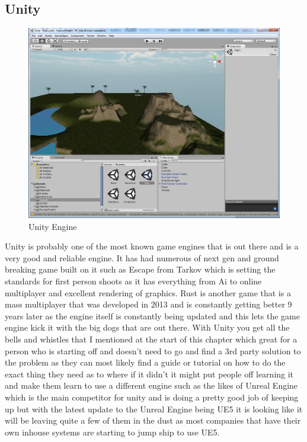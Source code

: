 \subsection{Unity}
\begin{figure}[H]
    \centering
    \includegraphics[scale=.3]{img/Unity.png}
    \caption{Unity Engine}
    \label{Unity}
\end{figure}
Unity is probably one of the most known game engines that is out there and is a very good and reliable engine. It has had numerous of next gen and ground breaking game built on it such as Escape from Tarkov which is setting the standards for first person shoots as it has everything from Ai to online multiplayer and excellent rendering of graphics. Rust is another game that is a mass multiplayer that was developed in 2013 and is constantly getting better 9 years later as the engine itself is constantly being updated and this lets the game engine kick it with the big dogs that are out there. With Unity you get all the bells and whistles that I mentioned at the start of this chapter which great for a person who is starting off and doesn't need to go and find a 3rd party solution to the problem as they can most likely find a guide or tutorial on how to do the exact thing they need as to where if it didn't it might put people off learning it and make them learn to use a different engine such as the likes of Unreal Engine which is the main competitor for unity and is doing a pretty good job of keeping up but with the latest update to the Unreal Engine being UE5 it is looking like it will be leaving quite a few of them in the dust as most companies that have their own inhouse systems are starting to jump ship to use UE5.

